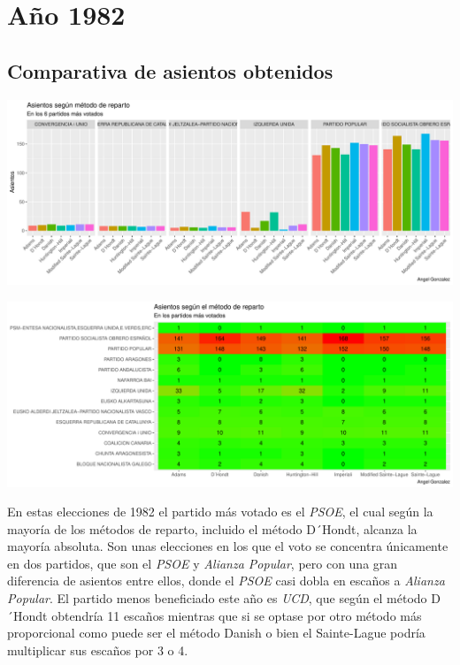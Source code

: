 \documentclass[12pt,a4paper,]{book}
\numberwithin{dummy}{section}
\theoremstyle{ocrenumbox}
\theoremstyle{blacknumex}
\theoremstyle{blacknumbox}
\theoremstyle{ocrenum}
\theoremstyle{ocrenum}
\begin{document}
\hypertarget{auxf1o-1982}{%
\section{Año 1982}\label{auxf1o-1982}}

\hypertarget{comparativa-de-asientos-obtenidos-2}{%
\subsection{Comparativa de asientos
obtenidos}\label{comparativa-de-asientos-obtenidos-2}}

\begin{center}\includegraphics[width=1\linewidth]{figurasR/unnamed-chunk-82-1} \end{center}

\begin{center}\includegraphics[width=1\linewidth]{figurasR/unnamed-chunk-82-2} \end{center}

En estas elecciones de 1982 el partido más votado es el \emph{PSOE}, el
cual según la mayoría de los métodos de reparto, incluido el método
D´Hondt, alcanza la mayoría absoluta. Son unas elecciones en los que el
voto se concentra únicamente en dos partidos, que son el \emph{PSOE} y
\emph{Alianza Popular}, pero con una gran diferencia de asientos entre
ellos, donde el \emph{PSOE} casi dobla en escaños a \emph{Alianza
Popular}. El partido menos beneficiado este año es \emph{UCD}, que según
el método D´Hondt obtendría 11 escaños mientras que si se optase por
otro método más proporcional como puede ser el método Danish o bien el
Sainte-Lague podría multiplicar sus escaños por 3 o 4.
\end{document}
